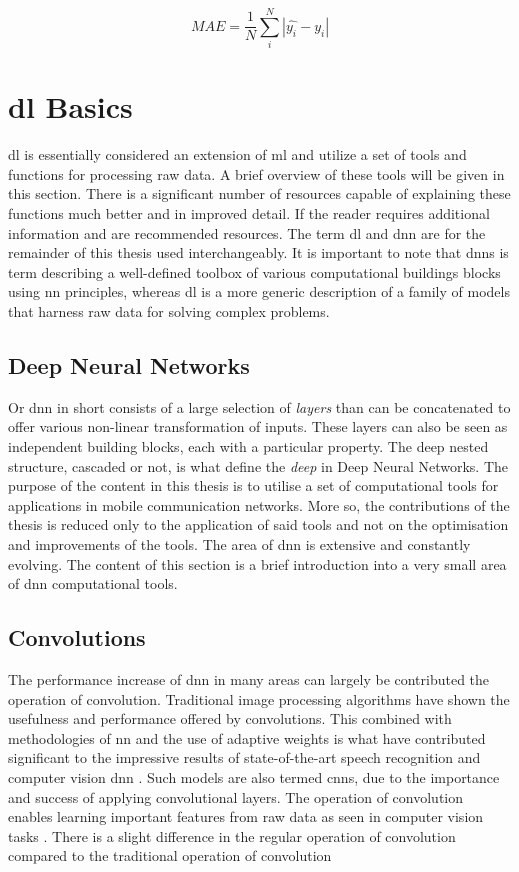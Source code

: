 \begin{equation}
    MAE =  \frac{1}{N} \sum_i^N |\hat{y_i} - y_i|
\end{equation}


\section{\gls{dl} Basics}\label{sec:dlbasics}

\gls{dl} is essentially considered an extension of \gls{ml} and utilize a set of tools and functions for processing raw data. A brief overview of these tools will be given in this section. There is a significant number of resources capable of explaining these functions much better and in improved detail. If the reader requires additional information \cite{Nielsen2015} and \cite{Goodfellow-et-al-2016} are recommended resources. The term \gls{dl} and \gls{dnn} are for the remainder of this thesis used interchangeably. It is important to note that \glspl{dnn} is term describing a well-defined toolbox of various computational buildings blocks using \gls{nn} principles, whereas \gls{dl} is a more generic description of a family of models that harness raw data for solving complex problems.

\subsection{Deep Neural Networks}
Or \gls{dnn} in short consists of a large selection of \emph{layers} than can be concatenated to offer various non-linear transformation of inputs. These layers can also be seen as independent building blocks, each with a particular property. The deep nested structure, cascaded or not, is what define the \emph{deep} in Deep Neural Networks. The purpose of the content in this thesis is to utilise a set of computational tools for applications in mobile communication networks. More so, the contributions of the thesis is reduced only to the application of said tools and not on the optimisation and improvements of the tools. The area of \gls{dnn} is extensive and constantly evolving. The content of this section is a brief introduction into a very small area of \gls{dnn} computational tools. 

\subsection{Convolutions}\label{sec:convolutions}
The performance increase of \gls{dnn} in many areas can largely be contributed the operation of convolution. Traditional image processing algorithms have shown the usefulness and performance offered by convolutions. This combined with methodologies of \gls{nn} and the use of adaptive weights is what have contributed significant to the impressive results of state-of-the-art speech recognition and computer vision \gls{dnn} \cite{Goodfellow-et-al-2016}. Such models are also termed \glspl{cnn}, due to the importance and success of applying convolutional layers. The operation of convolution enables learning important features from raw data as seen in computer vision tasks \cite{LeCun2015}. There is a slight difference in the regular operation of convolution compared to the traditional operation of convolution

